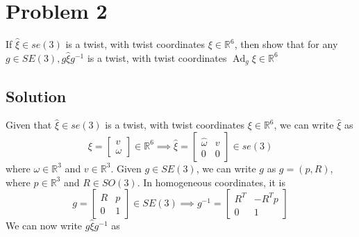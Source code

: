 \section*{Problem 2}
\setcounter{section}{2}
\setcounter{equation}{0}

If \( \widehat{\xi} \in s e(3) \) is a twist, with twist coordinates \( \xi \in \mathbb{R}^{6} \), then show that for any \( g \in S E(3), g \widehat{\xi} g^{-1} \) is a twist, with twist coordinates \( \operatorname{Ad}_{g} \xi \in \mathbb{R}^{6} \)

\subsection*{Solution}

Given that \( \widehat{\xi} \in s e(3) \) is a twist, with twist coordinates \( \xi \in \mathbb{R}^{6} \), we can write \( \widehat{\xi} \) as
\begin{equation}\label{eq:twist}
    \xi
    =
    \begin{bmatrix}
        v \\
        \omega
    \end{bmatrix}
    \in \mathbb{R}^{6}
    \implies
    \widehat{\xi}
    =
    \begin{bmatrix}
        \widehat{\omega} & v \\
        0                & 0
    \end{bmatrix}
    \in s e(3)
\end{equation}
where \( \omega \in \mathbb{R}^{3} \) and \( v \in \mathbb{R}^{3} \).
Given \( g \in S E(3) \), we can write \( g \) as \( g = (p, R) \), where \( p \in \mathbb{R}^{3} \) and \( R \in S O(3) \).
In homogeneous coordinates, it is
\begin{equation*}
    g
    =
    \begin{bmatrix}
        R & p \\
        0 & 1
    \end{bmatrix}
    \in S E(3)
    \implies
    g^{-1}
    =
    \begin{bmatrix}
        R^{T} & -R^{T} p \\
        0     & 1
    \end{bmatrix}
\end{equation*}
We can now write \( g \widehat{\xi} g^{-1} \) as
